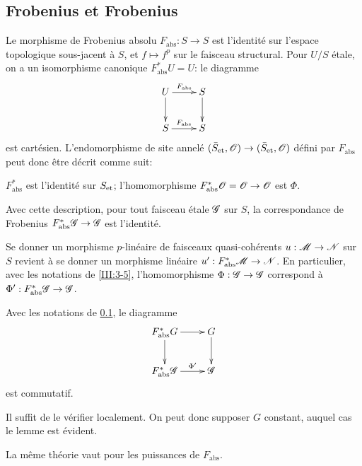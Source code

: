 \subsection{Frobenius et Frobenius}\label{III:3-4}

Le morphisme de Frobenius absolu $F_\text{abs}:S\to S$ est l'identité sur 
l'espace topologique sous-jacent à $S$, et $f\mapsto f^p$ sur le faisceau 
structural. Pour $U/S$ étale, on a un isomorphisme canonique 
$F_\text{abs}^* U=U$: le diagramme 
\[\xymatrix{
  U \ar[r]^-{F_\text{abs}} \ar[d] 
    & S \ar[d] \\
  S \ar[r]^-{F_\text{abs}} 
    & S
}\]
est cartésien. L'endomorphisme de site annelé 
$({\bar S}_{\textnormal{et}},\mathscr{O})\to({\bar S}_{\textnormal{et}},\mathscr{O})$ défini par $F_\text{abs}$ peut donc 
être décrit comme suit:
\begin{center}
  $F_\text{abs}^*$ est l'identité sur ${S}_{\textnormal{et}}$; l'homomorphisme 
  $F_\text{abs}^*\mathscr{O}=\mathscr{O}\to\mathscr{O}$ est $\Phi$.
\end{center}
Avec cette description, pour tout faisceau étale $\mathscr{G}$ sur $S$, la 
correspondance de Frobenius $F_\text{abs}^*\mathscr{G}\to\mathscr{G}$ est l'identité. 

Se donner un morphisme $p$-linéaire de faisceaux quasi-cohérents 
$u:\mathscr{M}\to\mathscr{N}$ sur $S$ revient à se donner un morphisme linéaire 
$u':F_\text{abs}^*\mathscr{M}\to\mathscr{N}$. En particulier, avec les notations de 
\ref{III:3-5}, l'homomorphisme $\Phi:\mathscr{G}\to\mathscr{G}$ correspond à 
$\Phi':F_\text{abs}^*\mathscr{G}\to\mathscr{G}$. 





\begin{lemma_}\label{III:3-5}
Avec les notations de \ref{III:3-4}, le diagramme 
\[\xymatrix{
  F_\textnormal{abs}^* G \ar[r] \ar[d] 
    & G \ar[d] \\
  F_\textnormal{abs}^*\cG \ar[r]^-{\Phi'} 
    & \cG 
}\]
est commutatif.
\end{lemma_}

Il suffit de le vérifier localement. On peut donc supposer $G$ constant, 
auquel cas le lemme est évident. 

La même théorie vaut pour les puissances de $F_\text{abs}$.





\subsection{}\label{III:3-6}

